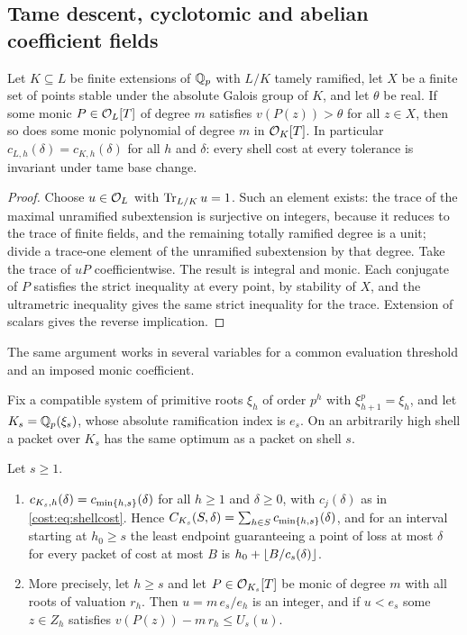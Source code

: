 \subsection{Tame descent, cyclotomic and abelian coefficient fields}\label{cost:sec:abelian}
{\raggedright{}}

\begin{proposition}\label{cost:prop:tame}
Let $K\subseteq L$ be finite extensions of $\mathbb{Q}_p$ with $L/K$ tamely ramified, let $X$ be a
finite set of points stable under the absolute Galois group of $K$, and let $\theta$ be
real. If some monic $P\in\mathcal{O}_L[T]$ of degree $m$ satisfies $v(P(z))>\theta$ for all $z\in X$,
then so does some monic polynomial of degree $m$ in $\mathcal{O}_K[T]$. In particular
$c_{L,h}(\delta)=c_{K,h}(\delta)$ for all $h$ and $\delta$: every shell cost at every
tolerance is invariant under tame base change.
\end{proposition}

\begin{proof}
Choose $u\in\mathcal{O}_L$ with $\operatorname{Tr}_{L/K}u=1$. Such an element exists: the trace of the maximal
unramified subextension is surjective on integers, because it reduces to the trace of
finite fields, and the remaining totally ramified degree is a unit; divide a trace-one
element of the unramified subextension by that degree. Take the trace of $uP$
coefficientwise. The result is integral and monic. Each conjugate of $P$ satisfies the
strict inequality at every point, by stability of $X$, and the ultrametric inequality gives
the same strict inequality for the trace. Extension of scalars gives the reverse
implication.
\end{proof}

The same argument works in several variables for a common evaluation threshold and an
imposed monic coefficient.

Fix a compatible system of primitive roots $\xi_h$ of order $p^h$ with $\xi_{h+1}^p=\xi_h$,
and let $K_s=\mathbb{Q}_p(\xi_s)$, whose absolute ramification index is $e_s$. On an arbitrarily high
shell a packet over $K_s$ has the same optimum as a packet on shell $s$.

\begin{theorem}\label{cost:thm:cyclotomic}
Let $s\ge1$.
\begin{enumerate}[label=\textup{(\roman*)}]
\item $c_{K_s,h}(\delta)=c_{\min\{h,s\}}(\delta)$ for all $h\ge1$ and $\delta\ge0$, with
$c_j(\delta)$ as in \eqref{cost:eq:shellcost}. Hence
$C_{K_s}(S,\delta)=\sum_{h\in S}c_{\min\{h,s\}}(\delta)$, and for an interval starting at
$h_0\ge s$ the least endpoint guaranteeing a point of loss at most $\delta$ for every
packet of cost at most $B$ is $h_0+\lfloor B/c_s(\delta)\rfloor$.
\item More precisely, let $h\ge s$ and let $P\in\mathcal{O}_{K_s}[T]$ be monic of degree $m$ with all
roots of valuation $r_h$. Then $u=m\,e_s/e_h$ is an integer, and if $u<e_s$ some $z\in Z_h$
satisfies $v(P(z))-m\,r_h\le U_s(u)$.
\end{enumerate}
\end{theorem}

